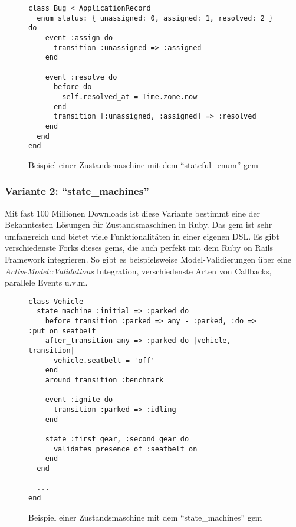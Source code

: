 \begin{figure}[H]
\begin{codebox}
\begin{verbatim}
class Bug < ApplicationRecord
  enum status: { unassigned: 0, assigned: 1, resolved: 2 } do
    event :assign do
      transition :unassigned => :assigned
    end

    event :resolve do
      before do
        self.resolved_at = Time.zone.now
      end
      transition [:unassigned, :assigned] => :resolved
    end
  end
end
\end{verbatim}
\end{codebox}
\caption{\label{fig:stateful-enum-example}Beispiel einer Zustandsmaschine mit dem \enquote{stateful\_enum} gem \cite{stateful_enum_github}}
\end{figure}

\subsubsection{Variante 2: \enquote{state\_machines}}

Mit fast 100 Millionen Downloads \cite{statstate_machines-activemodel_rubygems} ist diese Variante bestimmt eine der Bekanntesten Lösungen für Zustandsmaschinen in Ruby.
Das gem ist sehr umfangreich und bietet viele Funktionalitäten in einer eigenen DSL. Es gibt verschiedenste Forks dieses gems,
die auch perfekt mit dem Ruby on Rails Framework integrieren. So gibt es beispielsweise Model-Validierungen über eine \emph{ActiveModel::Validations} Integration,
verschiedenste Arten von Callbacks, parallele Events u.v.m.

\begin{figure}[H]
\begin{codebox}
\begin{verbatim}
class Vehicle
  state_machine :initial => :parked do
    before_transition :parked => any - :parked, :do => :put_on_seatbelt
    after_transition any => :parked do |vehicle, transition|
      vehicle.seatbelt = 'off'
    end
    around_transition :benchmark

    event :ignite do
      transition :parked => :idling
    end

    state :first_gear, :second_gear do
      validates_presence_of :seatbelt_on
    end
  end

  ...
end
\end{verbatim}
\end{codebox}
\caption{\label{fig:state-machine-example}Beispiel einer Zustandsmaschine mit dem \enquote{state\_machines} gem \cite{state_machines-activemodel_github}}
\end{figure}

